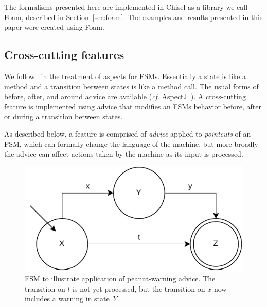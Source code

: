 \documentclass[sigplan,anonymous,review]{acmart}
\begin{document}
The formalisms presented here are implemented in Chisel as a library we call Foam, described in Section~\ref{sec:foam}.  The examples and results presented in this paper were created using Foam.  

\subsection{Cross-cutting features}\label{sec:ccut}
We follow~\cite{aspectsUML} in the treatment of aspects for FSMs.  Essentially a state is like a method and a transition between states is like a method call.  The usual forms of before, after, and around advice are available (\textit{cf}. AspectJ~\cite{AspectJ:01}).   A cross-cutting feature is implemented using advice that modifies an FSMs behavior before, after or during a transition between states.

As described below, a feature is comprised of \emph{advice} applied to \emph{pointcuts} of an FSM, which can formally change the language of the machine, but more broadly the advice can affect actions taken by the machine as its input is processed.  

\begin{figure}
    \centering
    \includegraphics[width=0.7\linewidth]{figures/ExampleFSM.pdf}
    \caption{FSM to illustrate application of peanut-warning advice.  The transition on $t$ is not yet processed, but the transition on $x$ now includes a warning in state~$Y$.}
    \label{fig:applyadvice}
\end{figure}
\end{document}
